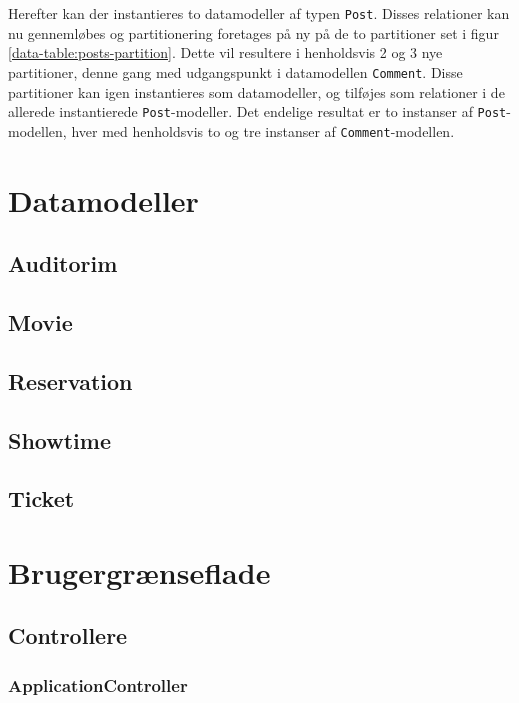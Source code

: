Herefter kan der instantieres to datamodeller af typen \texttt{Post}. Disses relationer kan nu gennemløbes og partitionering foretages på ny på de to partitioner set i figur \ref{data-table:posts-partition}. Dette vil resultere i henholdsvis 2 og 3 nye partitioner, denne gang med udgangspunkt i datamodellen \texttt{Comment}. Disse partitioner kan igen instantieres som datamodeller, og tilføjes som relationer i de allerede instantierede \texttt{Post}-modeller. Det endelige resultat er to instanser af \texttt{Post}-modellen, hver med henholdsvis to og tre instanser af \texttt{Comment}-modellen.

\section{Datamodeller}

\subsection{Auditorim}

\subsection{Movie}

\subsection{Reservation}

\subsection{Showtime}

\subsection{Ticket}

\section{Brugergrænseflade}

\subsection{Controllere}

\subsubsection{ApplicationController}

